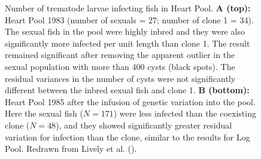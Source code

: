 \documentclass[
  letterpaper,
]{book}
\begin{document}
\begin{figure}


\caption[Number of trematode larvae infecting fish in Heart
Pool]{\label{fig-5-3}Number of trematode larvae infecting fish in Heart
Pool. \textbf{A (top):} Heart Pool 1983 (number of sexuals = 27; number
of clone 1 = 34). The sexual fish in the pool were highly inbred and
they were also significantly more infected per unit length than clone 1.
The result remained significant after removing the apparent outlier in
the sexual population with more than 400 cysts (black spots). The
residual variances in the number of cysts were not significantly
different between the inbred sexual fish and clone 1. \textbf{B
(bottom):} Heart Pool 1985 after the infusion of genetic variation into
the pool. Here the sexual fish (\(N=171\)) were less infected than the
coexisting clone (\(N=48\)), and they showed significantly greater
residual variation for infection than the clone, similar to the results
for Log Pool. Redrawn from Lively et al.
().}

\end{figure}%
\end{document}
